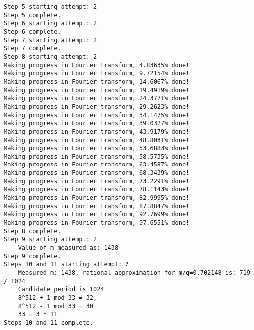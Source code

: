 \documentclass[]{article}
\begin{document}
\begin{verbatim}
Step 5 starting attempt: 2
Step 5 complete.
Step 6 starting attempt: 2
Step 6 complete.
Step 7 starting attempt: 2
Step 7 complete.
Step 8 starting attempt: 2
Making progress in Fourier transform, 4.83635% done!
Making progress in Fourier transform, 9.72154% done!
Making progress in Fourier transform, 14.6067% done!
Making progress in Fourier transform, 19.4919% done!
Making progress in Fourier transform, 24.3771% done!
Making progress in Fourier transform, 29.2623% done!
Making progress in Fourier transform, 34.1475% done!
Making progress in Fourier transform, 39.0327% done!
Making progress in Fourier transform, 43.9179% done!
Making progress in Fourier transform, 48.8031% done!
Making progress in Fourier transform, 53.6883% done!
Making progress in Fourier transform, 58.5735% done!
Making progress in Fourier transform, 63.4587% done!
Making progress in Fourier transform, 68.3439% done!
Making progress in Fourier transform, 73.2291% done!
Making progress in Fourier transform, 78.1143% done!
Making progress in Fourier transform, 82.9995% done!
Making progress in Fourier transform, 87.8847% done!
Making progress in Fourier transform, 92.7699% done!
Making progress in Fourier transform, 97.6551% done!
Step 8 complete.
Step 9 starting attempt: 2
	Value of m measured as: 1438
Step 9 complete.
Steps 10 and 11 starting attempt: 2
	Measured m: 1438, rational approximation for m/q=0.702148 is: 719 / 1024
	Candidate period is 1024
	8^512 + 1 mod 33 = 32,
	8^512 - 1 mod 33 = 30
	33 = 3 * 11
Steps 10 and 11 complete.
\end{verbatim}
\end{document}
